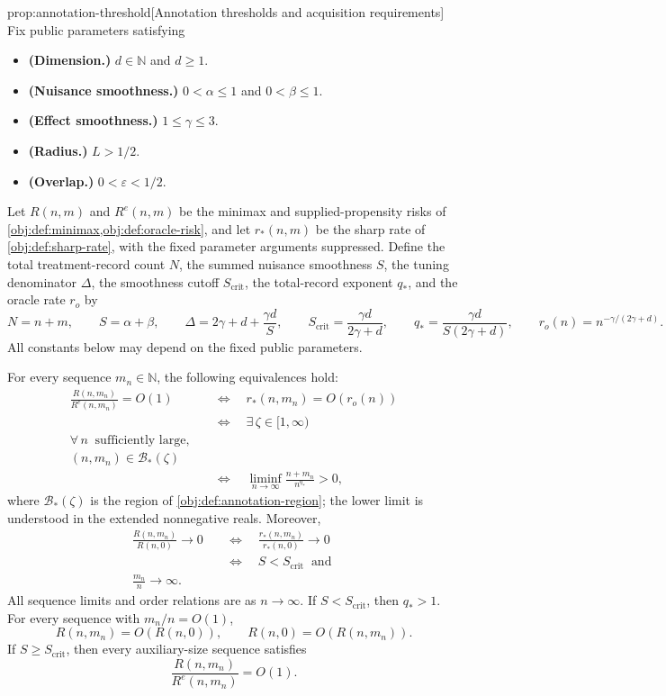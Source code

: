 \documentclass[11pt]{article}
\begin{document}
\begin{propositionv}{prop:annotation-threshold}[Annotation thresholds and acquisition requirements]
Fix public parameters satisfying
\begin{itemize}
\item \textbf{(Dimension.)} \(d\in\mathbb N\) and \(d\ge1\).
\item \textbf{(Nuisance smoothness.)} \(0<\alpha\le1\) and \(0<\beta\le1\).
\item \textbf{(Effect smoothness.)} \(1\le\gamma\le3\).
\item \textbf{(Radius.)} \(L>1/2\).
\item \textbf{(Overlap.)} \(0<\varepsilon<1/2\).
\end{itemize}
Let \(R(n,m)\) and \(R^e(n,m)\) be the minimax and supplied-propensity risks of \cref{obj:def:minimax,obj:def:oracle-risk}, and let \(r_*(n,m)\) be the sharp rate of \cref{obj:def:sharp-rate}, with the fixed parameter arguments suppressed. Define the total treatment-record count \(N\), the summed nuisance smoothness \(S\), the tuning denominator \(\Delta\), the smoothness cutoff \(S_{\mathrm{crit}}\), the total-record exponent \(q_*\), and the oracle rate \(r_o\) by
\[
N=n+m,\qquad S=\alpha+\beta,\qquad
\Delta=2\gamma+d+\frac{\gamma d}{S},
\qquad
S_{\mathrm{crit}}=\frac{\gamma d}{2\gamma+d},
\qquad
q_*=\frac{\gamma d}{S(2\gamma+d)},
\qquad
r_o(n)=n^{-\gamma/(2\gamma+d)}.
\]
All constants below may depend on the fixed public parameters.

For every sequence \(m_n\in\mathbb N\), the following equivalences hold:
\[
\begin{aligned}
\frac{R(n,m_n)}{R^e(n,m_n)}=O(1)
&\quad\Longleftrightarrow\quad
r_*(n,m_n)=O(r_o(n))\\
&\quad\Longleftrightarrow\quad
\exists\,\zeta\in[1,\infty)\\ 
\forall\,n\ \text{ sufficiently large},\\
(n,m_n)\in\mathcal B_*(\zeta)\\
&\quad\Longleftrightarrow\quad
\liminf_{n\to\infty}\frac{n+m_n}{n^{q_*}}>0,
\end{aligned}
\]
where \(\mathcal B_*(\zeta)\) is the region of \cref{obj:def:annotation-region}; the lower limit is understood in the extended nonnegative reals. Moreover,
\[
\begin{aligned}
\frac{R(n,m_n)}{R(n,0)}\longrightarrow0
&\quad\Longleftrightarrow\quad
\frac{r_*(n,m_n)}{r_*(n,0)}\longrightarrow0\\
&\quad\Longleftrightarrow\quad
S<S_{\mathrm{crit}}
\ \text{ and }\\ 
\frac{m_n}{n}\longrightarrow\infty.
\end{aligned}
\]
All sequence limits and order relations are as \(n\to\infty\). If \(S<S_{\mathrm{crit}}\), then \(q_*>1\). For every sequence with \(m_n/n=O(1)\),
\[
R(n,m_n)=O(R(n,0)),
\qquad
R(n,0)=O(R(n,m_n)).
\]
If \(S\ge S_{\mathrm{crit}}\), then every auxiliary-size sequence satisfies
\[
\frac{R(n,m_n)}{R^e(n,m_n)}=O(1).
\]


\end{propositionv}
\end{document}
